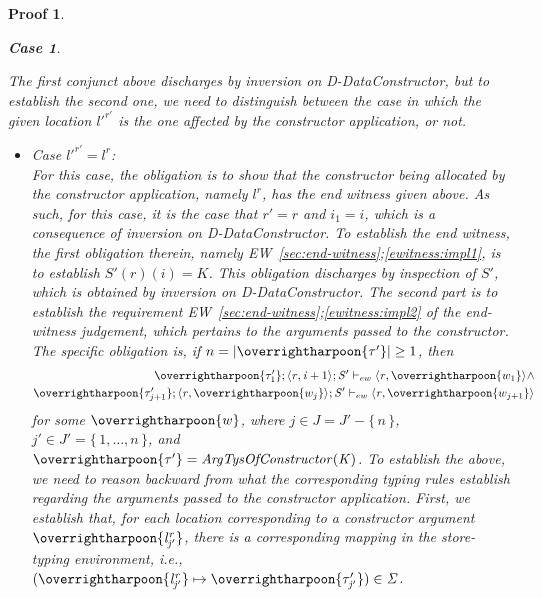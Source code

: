 \documentclass[showabstract,showacknowledgments,showpreface,showdedication,school]{iuphd}
\newtheorem*{bcase}{Case}
\theoremstyle{nonumberplain}
\newtheorem{nproof}{Proof}
\newcommand{\keywd}[1]{\mathit{#1}}
\newcommand{\skeywd}[1]{\mathit{#1}}
\newcommand{\DC}{\keywd{K}}
\newcommand{\TYP}{\keywd{\tau}}
\newcommand{\loc}{\skeywd{l}}
\newcommand{\concreteloc}[3]{\ensuremath{\langle #1, #2 \rangle ^{#3}}}
\newcommand{\reg}{\skeywd{r}}
\newcommand{\ind}{\keywd{i}}
\newcommand{\indj}{\keywd{j}}
\newcommand{\STOR}{\keywd{S}}
\newcommand\set[1]{\{ \, \ensuremath{#1} \,\}}
\newcommand{\SENV}{\keywd{\Sigma}}
\newcommand{\locreg}[2]{\ensuremath{{#1}^{#2}}}
\newcommand{\kargtys}{\keywd{ArgTysOfConstructor}}
\newcommand{\ewitness}[4]{\ensuremath{#1;#2;#3 \vdash_{ew} #4}}
\newcommand{\refendwitness}[2]{EW~\ref{#1};\ref{#2}}
\newcommand{\ddatacon}{D-DataConstructor}
\newcommand{\overharpoon}[1]{\overrightharpoon{#1}}
\begin{document}
\begin{nproof}
\begin{bcase}
\begin{itemize}
\begin{itemize}
      The first conjunct above discharges
      by inversion on \ddatacon{}, but
      to establish the second one, we need to distinguish
      between the case in which the given location $\locreg{\loc'}{\reg'}$ is the one
      affected by the constructor application, or not.
      \begin{itemize}
      \item Case $\locreg{\loc'}{\reg'} = \locreg{\loc}{\reg}$: \\
        For this case, the obligation is to show that the constructor being
        allocated by the constructor application, namely $\locreg{\loc}{\reg}$,
        has the end witness given above.
        As such, for this case, it is the case that $\reg' = \reg$ and $\ind_1 = \ind$, which is
        a consequence of inversion on \ddatacon{}.
        To establish the end witness, the first obligation therein, namely \refendwitness{sec:end-witness}{ewitness:impl1},
        is to establish $\STOR'(r)(i) = \DC$.
        This obligation discharges by inspection of $\STOR'$, which is obtained by inversion on \ddatacon{}.
        The second part is to establish the requirement
        \refendwitness{sec:end-witness}{ewitness:impl2} of the end-witness
        judgement, which pertains to the arguments passed to the constructor.
        The specific obligation is, if $n = | \overharpoon{\TYP'} | \geq 1$, then
           \begin{align}
           \ewitness{\overharpoon{\TYP'_1}}{\concreteloc{\reg}{\ind + 1}{}}{\STOR'}{\concreteloc{\reg}{\overharpoon{w_1}}{}} \wedge \label{prf:ew-req1} \\
           \ewitness{\overharpoon{\TYP'_{j+1}}}{\concreteloc{\reg}{\overharpoon{w_j}}{}}{\STOR'}{\concreteloc{\reg}{\overharpoon{w_{j+1}}}{}} \label{prf:ew-req2}
           \end{align}
           for some $\overharpoon{w}$, where
           $\indj \in J = J' - \set{n}$, $\indj' \in J' = \set{1,\ldots,n}$, and\\
           $\overharpoon{\TYP'} = \kargtys(\DC)$.
           To establish the above, we need
           to reason backward from what
           the corresponding typing rules establish regarding the
           arguments passed to the constructor application.
           First, we establish that, for each location corresponding to a constructor argument
           $\overharpoon{\locreg{\loc}{\reg}_{\indj'}}$,
           there is a corresponding mapping in the store-typing environment, i.e.,
           $(\overharpoon{\locreg{\loc}{\reg}_{\indj'}} \mapsto \overharpoon{\TYP_{\indj'}'}) \in \SENV$.

\end{itemize}
\end{itemize}
\end{itemize}
\end{bcase}
\end{nproof}
\end{document}
